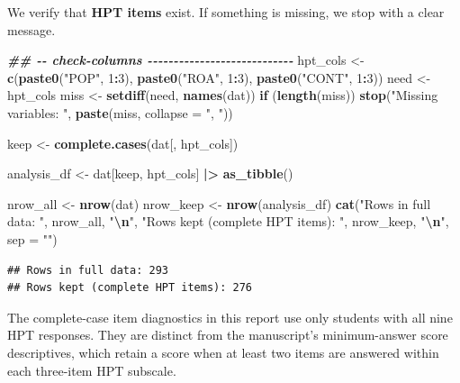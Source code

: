 \documentclass[
  10pt,
]{article}
\newenvironment{Shaded}{\begin{snugshade}}{\end{snugshade}}
\newcommand{\AttributeTok}[1]{\textcolor[rgb]{0.13,0.29,0.53}{#1}}
\newcommand{\ControlFlowTok}[1]{\textcolor[rgb]{0.13,0.29,0.53}{\textbf{#1}}}
\newcommand{\DecValTok}[1]{\textcolor[rgb]{0.00,0.00,0.81}{#1}}
\newcommand{\DocumentationTok}[1]{\textcolor[rgb]{0.56,0.35,0.01}{\textbf{\textit{#1}}}}
\newcommand{\FunctionTok}[1]{\textcolor[rgb]{0.13,0.29,0.53}{\textbf{#1}}}
\newcommand{\NormalTok}[1]{#1}
\newcommand{\OtherTok}[1]{\textcolor[rgb]{0.56,0.35,0.01}{#1}}
\newcommand{\SpecialCharTok}[1]{\textcolor[rgb]{0.81,0.36,0.00}{\textbf{#1}}}
\newcommand{\StringTok}[1]{\textcolor[rgb]{0.31,0.60,0.02}{#1}}
\begin{document}
We verify that \textbf{HPT items} exist. If something is missing, we
stop with a clear message.

\begin{Shaded}
\begin{Highlighting}[]
\DocumentationTok{\#\# {-}{-} check{-}columns {-}{-}{-}{-}{-}{-}{-}{-}{-}{-}{-}{-}{-}{-}{-}{-}{-}{-}{-}{-}{-}{-}{-}{-}{-}{-}{-}{-}}
\NormalTok{hpt\_cols }\OtherTok{\textless{}{-}} \FunctionTok{c}\NormalTok{(}\FunctionTok{paste0}\NormalTok{(}\StringTok{"POP"}\NormalTok{, }\DecValTok{1}\SpecialCharTok{:}\DecValTok{3}\NormalTok{), }\FunctionTok{paste0}\NormalTok{(}\StringTok{"ROA"}\NormalTok{, }\DecValTok{1}\SpecialCharTok{:}\DecValTok{3}\NormalTok{), }\FunctionTok{paste0}\NormalTok{(}\StringTok{"CONT"}\NormalTok{, }\DecValTok{1}\SpecialCharTok{:}\DecValTok{3}\NormalTok{))}
\NormalTok{need   }\OtherTok{\textless{}{-}}\NormalTok{ hpt\_cols}
\NormalTok{miss   }\OtherTok{\textless{}{-}} \FunctionTok{setdiff}\NormalTok{(need, }\FunctionTok{names}\NormalTok{(dat))}
\ControlFlowTok{if}\NormalTok{ (}\FunctionTok{length}\NormalTok{(miss)) }\FunctionTok{stop}\NormalTok{(}\StringTok{"Missing variables: "}\NormalTok{, }\FunctionTok{paste}\NormalTok{(miss, }\AttributeTok{collapse =} \StringTok{", "}\NormalTok{))}

\NormalTok{keep }\OtherTok{\textless{}{-}} \FunctionTok{complete.cases}\NormalTok{(dat[, hpt\_cols])}

\NormalTok{analysis\_df }\OtherTok{\textless{}{-}}\NormalTok{ dat[keep, hpt\_cols] }\SpecialCharTok{|\textgreater{}}
  \FunctionTok{as\_tibble}\NormalTok{()}

\NormalTok{nrow\_all   }\OtherTok{\textless{}{-}} \FunctionTok{nrow}\NormalTok{(dat)}
\NormalTok{nrow\_keep  }\OtherTok{\textless{}{-}} \FunctionTok{nrow}\NormalTok{(analysis\_df)}
\FunctionTok{cat}\NormalTok{(}\StringTok{"Rows in full data: "}\NormalTok{, nrow\_all,  }\StringTok{"}\SpecialCharTok{\textbackslash{}n}\StringTok{"}\NormalTok{,}
    \StringTok{"Rows kept (complete HPT items): "}\NormalTok{, nrow\_keep, }\StringTok{"}\SpecialCharTok{\textbackslash{}n}\StringTok{"}\NormalTok{, }\AttributeTok{sep =} \StringTok{""}\NormalTok{)}
\end{Highlighting}
\end{Shaded}

\begin{verbatim}
## Rows in full data: 293
## Rows kept (complete HPT items): 276
\end{verbatim}

The complete-case item diagnostics in this report use only students with
all nine HPT responses. They are distinct from the manuscript's
minimum-answer score descriptives, which retain a score when at least
two items are answered within each three-item HPT subscale.
\end{document}
